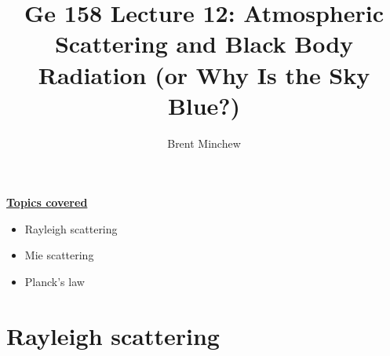 \documentclass[11pt, oneside]{article}
\title{Ge 158 Lecture 12: Atmospheric Scattering and Black Body Radiation (or Why Is the Sky Blue?)}
\author{Brent Minchew}
\date{}
\begin{document}
\maketitle

\noindent\underline{\textbf{Topics covered}}
\begin{itemize}
	\item Rayleigh scattering
	\item Mie scattering
	\item Planck's law
\end{itemize}

\section{Rayleigh scattering}
\label{s:rayleigh}
\end{document}
